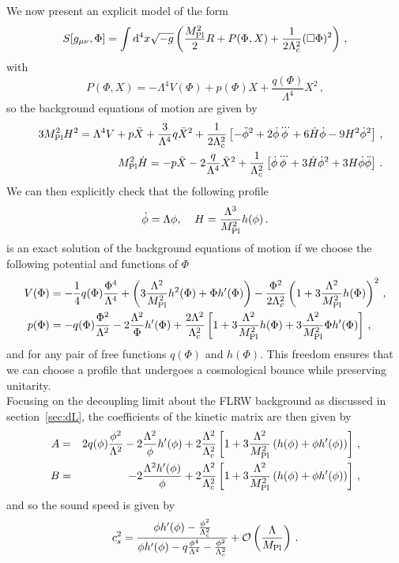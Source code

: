 \documentclass[12pt]{article}
\def\ba{\begin{eqnarray}}
\def\ea{\end{eqnarray}}
\def\mpl{M_{\rm Pl}}
\def\d{\mathrm{d}}
\def\({\left(}
\def\){\right)}
\def\mn{_{\mu \nu}}
\begin{document}
We now present an explicit model of the form
\ba
S[g\mn, \Phi]=\int \d^4 x \sqrt{-g}\(\frac{\mpl^2}{2}R +P(\Phi,X)  +\frac{1}{2\Lambda_c^2} (\Box \Phi)^2 \) \,,
\ea
with
\begin{equation}
P ( \Phi, X ) = - \Lambda^4 V (\Phi) + p (\Phi) X + \frac{q ( \Phi)}{\Lambda^4} X^2\,,
\label{eqn:egPX}
\end{equation}
so the background equations of motion are given by
\ba
\label{eq:FriedPXLambdac2}
&& 3 \mpl^2 H^2 = \Lambda^4 V+ p \bar X +\frac{3}{\Lambda^4}q \bar X^2+\frac{1}{2\Lambda_c^2}\left[-\ddot \phi^2+2\dot \phi \dddot \phi+6 \dot H\dot \phi-9H^2 \dot \phi^2 \right] \, , \\
&& \mpl^2 \dot H = -p \bar X-2\frac{q}{\Lambda^4}\bar X^2 +\frac{1}{\Lambda_c^2} \left[\dot \phi \dddot \phi + 3\dot H \dot \phi^2+3 H \dot \phi \ddot \phi  \right]\,.
\label{eq:raychaudhuriLambdac2}
\ea
We can then explicitly check that the following profile
\begin{equation}
\dot \phi = \Lambda \phi , \;\;\;\; H =\frac{\Lambda^3}{\mpl^2} h (\phi )\,.
\end{equation}
is an exact solution of the background equations of motion if we choose the following potential and functions of $\Phi$
\begin{align}
V ( \Phi ) &= -\frac 14 q(\Phi) \frac{\Phi^4}{\Lambda^4} +  \left( 3\frac{\Lambda^2}{\mpl^2} h^2 (\Phi ) + \Phi h' (\Phi) \right) - \frac{\Phi^2}{2 \Lambda_c^2} \left( 1 + 3\frac{\Lambda^2}{\mpl^2} h (\Phi ) \right)^2 \, ,  \\
p (\Phi ) &= -  q(\Phi)\frac{\Phi^2}{\Lambda^2} -2 \frac{ \Lambda^2}{\Phi} h' (\Phi) + \frac{2 \Lambda^2}{\Lambda_c^2} \left[ 1 + 3 \frac{\Lambda^2}{\mpl^2} h (\Phi) + 3 \frac{\Lambda^2}{\mpl^2} \Phi h' (\Phi) \right] \, ,
\label{eqn:PX_direct}
\end{align}
and for any pair of free functions $q (\Phi)$ and $h(\Phi)$. This freedom ensures that we can choose a profile that undergoes a cosmological bounce while preserving unitarity. \\

Focusing on the decoupling limit about the FLRW background as discussed in section~\ref{sec:dL},
the coefficients of the kinetic matrix are then given by
\ba
A&=&2q(\phi) \frac{\phi^2}{\Lambda^2}-2\frac{\Lambda^2}{\phi}h'(\phi)+2\frac{\Lambda^2}{\Lambda_c^2}
\left[1+3\frac{\Lambda^2}{\mpl^2}\(h(\phi)+\phi h'(\phi)\)\right] \, ,\\
B&=&-2\frac{\Lambda^2 h'(\phi)}{\phi}+2\frac{\Lambda^2}{\Lambda_c^2}
\left[1+3\frac{\Lambda^2}{\mpl^2}\(h(\phi)+\phi h'(\phi)\)\right]\,,
\ea
and so the sound speed is given by
\ba
c_s^2=\frac{\phi h'(\phi)-\frac{\phi^2}{\Lambda_c^2}}{\phi h'(\phi)- q \frac{\phi^4}{\Lambda^4}- \frac{\phi^2}{\Lambda_c^2}} +\mathcal{O}\(\frac{\Lambda}{\mpl}\)\,.
\ea
\end{document}
